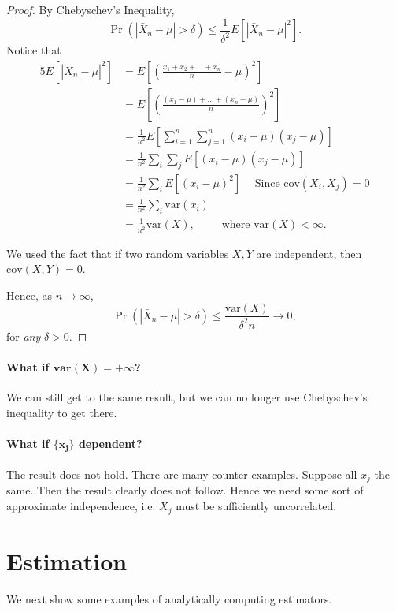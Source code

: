 \documentclass[12pt]{article}  \usepackage{algorithm2e} \usepackage{amsmath} \usepackage{amsthm} \usepackage{amsfonts} \usepackage{bbm} \usepackage{color,soul} \usepackage{framed} \usepackage[margin=0.5in]{geometry} \usepackage{hyperref} \usepackage{mathtools} \usepackage[dvipsnames]{xcolor}
\begin{document}
\begin{proof}   By Chebyschev's Inequality,
  \[
    \Pr(|\bar{X}_n - \mu| > \delta) \leq \frac{1}{\delta^2} E\left[ |\bar{X}_n - \mu|^2 \right].
  \]
  Notice that
  \begin{alignat*}{5}     
    E\left[ |\bar{X}_n - \mu|^2 \right]
    &= E \left[ \left(\frac{x_1 + x_2 + \ldots + x_n}{n} - \mu \right)^2 \right] \\
    &= E \left[ \left( \frac{(x_1 - \mu) + \ldots + (x_n - \mu)}{n}\right)^2 \right] \\
    &= \frac{1}{n^2} E \left[ \sum_{i=1}^n \sum_{j=1}^n (x_i - \mu) (x_j - \mu) \right] \\
    &= \frac{1}{n^2} \sum_{i} \sum_{j} E \left[ (x_i - \mu) (x_j - \mu)\right] \\
    &= \frac{1}{n^2} \sum_i E[(x_i-\mu)^2] \hspace{15pt} \textrm{Since } \textrm{cov}(X_i,X_j)=0\\
    &= \frac{1}{n^2} \sum_i \textrm{var}(x_i) \\
    &= \frac{1}{n^2} \textrm{var}(X), \hspace{25pt} \textrm{ where } \textrm{var}(X) < \infty. \end{alignat*}

We used the fact that if two random variables $X,Y$ are independent,
then $\textrm{cov}(X,Y) = 0$.

Hence, as $n\longrightarrow \infty$,
\[
\Pr( |\bar{X}_n - \mu| > \delta) \leq \frac{\textrm{var}(X)}{\delta^2 n} \longrightarrow 0,
\]
for \emph{any} $\delta > 0$. \end{proof}

\paragraph{What if $\pmb{\textrm{var}(X) = + \infty}$?} We can still get to the same result, but we can no longer use Chebyschev's inequality to get there.

\paragraph{What if $\pmb{\{x_j\}}$ dependent?} The result does not hold. There are many counter examples. Suppose all $x_j$ the same. Then the result clearly
does not follow. Hence we need some sort of approximate independence,
i.e. $X_j$ must be sufficiently uncorrelated.

\section{Estimation}
We next show some examples of analytically computing estimators.
\end{document}
